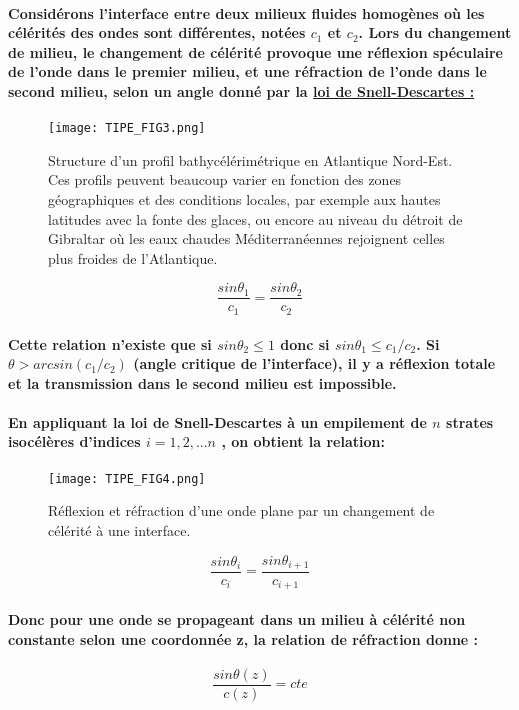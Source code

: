 \documentclass[a4paper,11pt]{article}
\begin{document}
\paragraph{\normalfont Consid\'{e}rons l'interface entre deux milieux fluides homog\`{e}nes o\`{u} les c\'{e}l\'{e}rit\'{e}s des ondes sont diff\'{e}rentes, not\'{e}es $c_1$ et $c_2$. Lors du changement de milieu, le changement de c\'{e}l\'{e}rit\'{e} provoque une r\'{e}flexion sp\'{e}culaire de l'onde dans le premier milieu, et une r\'{e}fraction de l'onde dans le second milieu, selon un angle donn\'{e} par la \textbf{\underline{loi de Snell-Descartes :}}}
\begin{figure}[!h]
\texttt{[image: TIPE\_FIG3.png]}
\caption{Structure d'un profil bathyc\'{e}l\'{e}rim\'{e}trique en Atlantique Nord-Est. Ces profils peuvent beaucoup varier en fonction des zones g\'{e}ographiques et des conditions locales, par exemple aux hautes latitudes avec la fonte des glaces, ou encore au niveau du d\'{e}troit de Gibraltar o\`{u} les eaux chaudes M\'{e}diterran\'{e}ennes rejoignent celles plus froides de l'Atlantique.}
\label{fig_3}
\end{figure}
\[\frac{sin\theta_1}{c_1}=\frac{sin\theta_2}{c_2}\]
\paragraph{\normalfont Cette relation n'existe que si $sin\theta_2 \leq 1$ donc si $sin\theta_1 \leq c_1/c_2$. Si $\theta > arcsin (c_1/c_2)$ (angle critique de l'interface), il y a r\'{e}flexion totale et la transmission dans le second milieu est impossible.}
\paragraph{\normalfont En appliquant la loi de Snell-Descartes \`{a} un empilement de $n$ strates isoc\'{e}l\`{e}res d'indices $i = 1,2,...n$ , on obtient la relation:}
\begin{figure}[!h]
\texttt{[image: TIPE\_FIG4.png]}
\caption{R\'{e}flexion et r\'{e}fraction d'une onde plane par un changement de c\'{e}l\'{e}rit\'{e} \`{a} une interface.}
\label{fig_4}
\end{figure}
\[\frac{sin\theta_i}{c_i}=\frac{sin\theta_{i+1}}{c_{i+1}}\]
\paragraph{\normalfont Donc pour une onde se propageant dans un milieu \`{a} c\'{e}l\'{e}rit\'{e} non constante selon une coordonn\'{e}e z, la relation de r\'{e}fraction donne :}
\[\frac{sin\theta(z)}{c(z)}=cte\]
\end{document}
